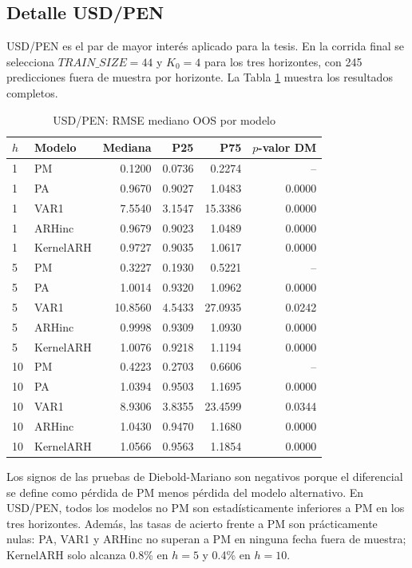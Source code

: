 \documentclass[a4paper,11pt]{article}
\begin{document}
\subsection{Detalle USD/PEN}

USD/PEN es el par de mayor interés aplicado para la tesis. En la corrida final se selecciona \(TRAIN\_SIZE=44\) y \(K_0=4\) para los tres horizontes, con 245 predicciones fuera de muestra por horizonte. La Tabla \ref{tab:usdpen_rmse} muestra los resultados completos.

\begin{table}[H]
\centering
\caption{USD/PEN: RMSE mediano OOS por modelo}
\label{tab:usdpen_rmse}
\small
\begin{tabular}{llrrrr}
\toprule
\(h\) & Modelo & Mediana & P25 & P75 & \(p\)-valor DM \\
\midrule
1 & PM & 0.1200 & 0.0736 & 0.2274 & -- \\
1 & PA & 0.9670 & 0.9027 & 1.0483 & 0.0000 \\
1 & VAR1 & 7.5540 & 3.1547 & 15.3386 & 0.0000 \\
1 & ARHinc & 0.9679 & 0.9023 & 1.0489 & 0.0000 \\
1 & KernelARH & 0.9727 & 0.9035 & 1.0617 & 0.0000 \\
5 & PM & 0.3227 & 0.1930 & 0.5221 & -- \\
5 & PA & 1.0014 & 0.9320 & 1.0962 & 0.0000 \\
5 & VAR1 & 10.8560 & 4.5433 & 27.0935 & 0.0242 \\
5 & ARHinc & 0.9998 & 0.9309 & 1.0930 & 0.0000 \\
5 & KernelARH & 1.0076 & 0.9218 & 1.1194 & 0.0000 \\
10 & PM & 0.4223 & 0.2703 & 0.6606 & -- \\
10 & PA & 1.0394 & 0.9503 & 1.1695 & 0.0000 \\
10 & VAR1 & 8.9306 & 3.8355 & 23.4599 & 0.0344 \\
10 & ARHinc & 1.0430 & 0.9470 & 1.1680 & 0.0000 \\
10 & KernelARH & 1.0566 & 0.9563 & 1.1854 & 0.0000 \\
\bottomrule
\end{tabular}
\end{table}

Los signos de las pruebas de Diebold-Mariano son negativos porque el diferencial se define como pérdida de PM menos pérdida del modelo alternativo. En USD/PEN, todos los modelos no PM son estadísticamente inferiores a PM en los tres horizontes. Además, las tasas de acierto frente a PM son prácticamente nulas: PA, VAR1 y ARHinc no superan a PM en ninguna fecha fuera de muestra; KernelARH solo alcanza 0.8\% en \(h=5\) y 0.4\% en \(h=10\).
\end{document}
